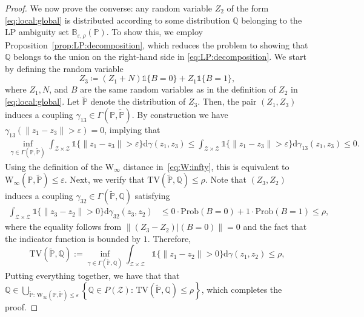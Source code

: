 \documentclass[11pt,a4paper]{article}
\begin{document}
\begin{proof}
We now prove the converse: any random variable $Z_2$ of the form \eqref{eq:local:global} is distributed according to some distribution $\mathbb Q$ belonging to the LP ambiguity set $\mathbb B_{\varepsilon,\rho}(\mathbb P)$. To show this, we employ Proposition~\ref{prop:LP:decomposition}, which reduces the problem to showing that $\mathbb Q$ belongs to the union on the right-hand side in \eqref{eq:LP:decomposition}. We start by defining the random variable
\begin{equation*}
    Z_3 \coloneqq (Z_1+N)\mathds{1}\{B = 0\}+Z_1\mathds{1}\{B = 1\},
\end{equation*}
where $Z_1, N$, and $B$ are the same random variables as in the definition of $Z_2$ in \eqref{eq:local:global}. Let $\widetilde{\mathbb{P}}$ denote the distribution of $Z_3$. Then, the pair $(Z_1, Z_3)$ induces a coupling $\gamma_{13} \in \Gamma(\mathbb P, \widetilde{\mathbb P})$. By construction we have $\gamma_{13}(\|z_1-z_3\|>\varepsilon) = 0$, implying that
\begin{align*}
    \inf_{\gamma \in \Gamma(\mathbb P, \widetilde{\mathbb P})} \int_{\mathcal Z \times \mathcal Z} \mathds{1}\{\|z_1 - z_3\| > \varepsilon\} \mathrm{d} \gamma(z_1,z_3) \leq \int_{\mathcal Z \times \mathcal Z} \mathds{1}\{\|z_1 - z_3\| > \varepsilon\} \mathrm{d} \gamma_{13}(z_1,z_3)\leq 0.
\end{align*}
Using the definition of the $\text{W}
_\infty$ distance in~\eqref{eq:W:infty}, this is equivalent to $\text{W}_\infty(\mathbb P, \widetilde{\mathbb P})\leq \varepsilon$. Next, we verify that $\text{TV}(\widetilde{\mathbb P},\mathbb Q)\leq \rho$. Note that $(Z_3, Z_2)$ induces a coupling $\gamma_{32} \in \Gamma(\widetilde{\mathbb P}, \mathbb Q)$ satisfying
\begin{align*}
    \int_{\mathcal Z \times \mathcal Z} \mathds{1}\{\|z_3 - z_2\| > 0\} \mathrm{d} \gamma_{32}(z_3,z_2) &\leq 0\cdot \text{Prob}(B = 0) + 1\cdot\text{Prob}(B=1) \leq \rho,
\end{align*}
where the equality follows from $\|(Z_3-Z_2) | (B=0)\| = 0$ and the fact that the indicator function is bounded by $1$. Therefore, 
\begin{equation*}
    \text{TV}(\widetilde{\mathbb P}, \mathbb Q) := \inf_{\gamma \in \Gamma(\widetilde{\mathbb P}, \mathbb Q)} \int_{\mathcal Z \times \mathcal Z} \mathds{1}\{\|z_1 - z_2\| > 0\} \mathrm{d} \gamma(z_1,z_2)\leq \rho,
\end{equation*}
Putting everything together, we have that that $\mathbb Q\in \bigcup_{\widetilde{\mathbb P}:\, \text{W}_\infty(\mathbb P, \widetilde{\mathbb P})\leq \varepsilon} \left\{\mathbb Q\in P(\mathcal{Z}):\, \text{TV}(\widetilde{\mathbb P},\mathbb Q)\leq \rho\right\}$, which completes the proof.
\end{proof}
\end{document}
